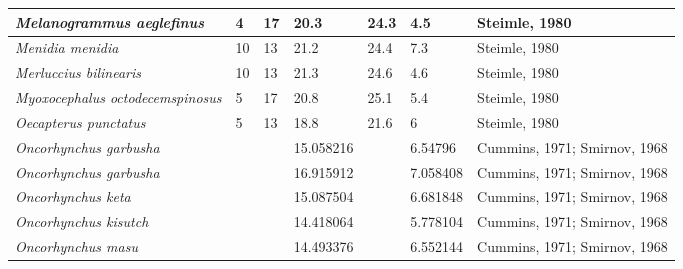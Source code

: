 \documentclass[a4paper]{article} %
\begin{document}
\begin{landscape}
\begin{longtable}[]{|l|p{1.8cm}|p{2cm}|p{2cm}|p{2.15cm}|p{1.9cm}|l|}
    \textit{Melanogrammus aeglefinus}        & 4                            & 17                         & 20.3                          & 24.3                              & 4.5                      & Steimle, 1980                \\ \hline
    \textit{Menidia menidia}                 & 10                           & 13                         & 21.2                          & 24.4                              & 7.3                      & Steimle, 1980                \\ \hline
    \textit{Merluccius bilinearis}           & 10                           & 13                         & 21.3                          & 24.6                              & 4.6                      & Steimle, 1980                \\ \hline
    \textit{Myoxocephalus octodecemspinosus} & 5                            & 17                         & 20.8                          & 25.1                              & 5.4                      & Steimle, 1980                \\ \hline
    \textit{Oecapterus punctatus}            & 5                            & 13                         & 18.8                          & 21.6                              & 6                        & Steimle, 1980                \\ \hline
    \textit{Oncorhynchus garbusha}           &                              &                            & 15.058216                     &                                   & 6.54796                  & Cummins, 1971; Smirnov, 1968 \\ \hline
    \textit{Oncorhynchus garbusha}           &                              &                            & 16.915912                     &                                   & 7.058408                 & Cummins, 1971; Smirnov, 1968 \\ \hline
    \textit{Oncorhynchus keta}               &                              &                            & 15.087504                     &                                   & 6.681848                 & Cummins, 1971; Smirnov, 1968 \\ \hline
    \textit{Oncorhynchus kisutch}            &                              &                            & 14.418064                     &                                   & 5.778104                 & Cummins, 1971; Smirnov, 1968 \\ \hline
    \textit{Oncorhynchus masu}               &                              &                            & 14.493376                     &                                   & 6.552144                 & Cummins, 1971; Smirnov, 1968 \\ \hline

\end{longtable}
\end{landscape}
\end{document}
